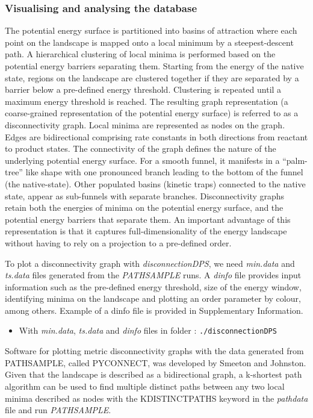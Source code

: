 \documentclass[journal=jacsat]{achemso}
\begin{document}
\subsubsection{Visualising and analysing the database}
The potential energy surface is partitioned into basins of attraction where each point on the landscape is mapped onto a local minimum by a steepest-descent path. A hierarchical clustering of local minima is performed based on the potential energy barriers separating them. Starting from the energy of the native state, regions on the landscape are clustered together if they are separated by a barrier below a pre-defined energy threshold. Clustering is repeated until a maximum energy threshold is reached. The resulting graph representation (a coarse-grained representation of the potential energy surface) is referred to as a disconnectivity graph. Local minima are represented as nodes on the graph. Edges are bidirectional comprising rate constants in both directions from reactant to product states. The connectivity of the graph defines the nature of the underlying potential energy surface. For a smooth funnel, it manifests in a ``palm-tree'' like shape with one pronounced branch leading to the bottom of the funnel (the native-state). Other populated basins (kinetic traps) connected to the native state, appear as sub-funnels with separate branches. Disconnectivity graphs retain both the energies of minima on the potential energy surface, and the potential energy barriers that separate them. An important advantage of this representation is that it captures  full-dimensionality of the energy landscape without having to rely on a projection to a pre-defined order. 

To plot a disconnectivity graph with \emph{disconnectionDPS}, we need  \emph{min.data} and \emph{ts.data} files generated from the \emph{PATHSAMPLE} runs. A \emph{dinfo} file provides input information such as the pre-defined energy threshold, size of the energy window, identifying minima on the landscape and plotting an order parameter by colour, among others. Example of a dinfo file is provided in Supplementary Information.

\begin{itemize}
\small
    \item {With \emph{min.data}, \emph{ts.data} and \emph{dinfo} files in folder : \tt{./disconnectionDPS}}
\end{itemize}

Software for plotting metric disconnectivity graphs with the data generated from PATHSAMPLE, called PYCONNECT, was developed by Smeeton and Johnston\cite{Smeeton14a}. Given that the landscape is described as a bidirectional graph, a k-shortest path algorithm\cite{Sharpe19a} can be used to find multiple distinct paths between any two local minima described as nodes with the KDISTINCTPATHS keyword \cite{PATHSAMPLE1} in the \emph{pathdata} file and run \emph{PATHSAMPLE}. 
\end{document}
